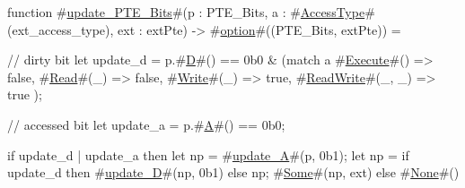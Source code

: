 function #\hyperref[sailRISCVzupdatezyPTEzyBits]{update\_PTE\_Bits}#(p : PTE_Bits, a : #\hyperref[sailRISCVzAccessType]{AccessType}#(ext_access_type), ext : extPte) -> #\hyperref[sailRISCVzoption]{option}#((PTE_Bits, extPte)) = {
  // dirty bit
  let update_d = p.#\hyperref[sailRISCVzD]{D}#() == 0b0 & (match a {
                                  #\hyperref[sailRISCVzExecute]{Execute}#()       => false,
                                  #\hyperref[sailRISCVzRead]{Read}#(_)         => false,
                                  #\hyperref[sailRISCVzWrite]{Write}#(_)        => true,
                                  #\hyperref[sailRISCVzReadWrite]{ReadWrite}#(_, _) => true
                                });

  // accessed bit
  let update_a = p.#\hyperref[sailRISCVzA]{A}#() == 0b0;

  if update_d | update_a then {
    let np = #\hyperref[sailRISCVzupdatezyA]{update\_A}#(p, 0b1);
    let np = if update_d then #\hyperref[sailRISCVzupdatezyD]{update\_D}#(np, 0b1) else np;
    #\hyperref[sailRISCVzSome]{Some}#(np, ext)
  } else #\hyperref[sailRISCVzNone]{None}#()
}
